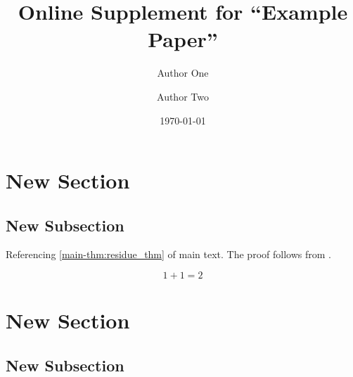 \documentclass[12pt]{article}
\title{Online Supplement for ``Example Paper''}
\author{
  Author One
  \and 
  Author Two
}
\date{\textsc{\today}}
\begin{document}
\maketitle
\appendix
\renewcommand{\thesection}{S.\arabic{section}}

\section{New Section}
\subsection{New Subsection}

Referencing \autoref{main-thm:residue_thm} of main text. The proof follows from \citet{mas1995microeconomic}.

\begin{equation}
  1 + 1 = 2
\end{equation}

\section{New Section}
\subsection{New Subsection}




\newpage
\printbibliography
\end{document}
